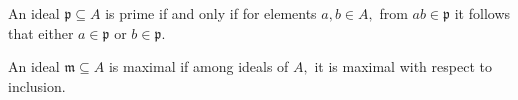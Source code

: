 \begin{prop}
  An ideal \(\mathfrak{p} \subseteq A\) is prime if and only if for elements \(a, b \in A,\) from \(ab \in \mathfrak{p}\) it follows that either \(a \in \mathfrak{p}\) or \(b \in \mathfrak{p}\).

  An ideal \(\mathfrak{m} \subseteq A\) is maximal if among ideals of \(A,\) it is maximal with respect to inclusion.
\end{prop}


